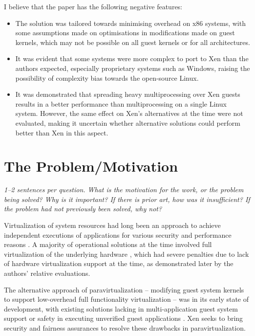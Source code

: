 \documentclass[11pt]{article}
\begin{document}
I believe that the paper has the following negative features:
\begin{itemize}
	\item The solution was tailored towards minimising overhead on x86 systems, with some assumptions made on optimisations in modifications made on guest kernels, which may not be possible on all guest kernels or for all architectures.
	\item It was evident that some systems were more complex to port to Xen than the authors expected, especially proprietary systems such as Windows, raising the possibility of complexity bias towards the open-source Linux.
	\item It was demonstrated that spreading heavy multiprocessing over Xen guests results in a better performance than multiprocessing on a single Linux system. However, the same effect on Xen's alternatives at the time were not evaluated, making it uncertain whether alternative solutions could perform better than Xen in this aspect.
\end{itemize}

\section*{The Problem/Motivation}
\textsl{1--2 sentences per question. What is the motivation for the work, or the problem being solved? Why is it important? If there is prior art, how was it insufficient? If the problem had not previously been solved, why not?}

Virtualization of system resources had long been an approach to achieve independent executions of applications for various security and performance reasons \cite{xing2012virtualization}. A majority of operational solutions at the time involved full virtualization of the underlying hardware \cite{goud2010method} \cite{devine2002virtualization}, which had severe penalties due to lack of hardware virtualization support at the time, as demonstrated later by the authors' relative evaluations. 

The alternative approach of paravirtualization -- modifying guest system kernels to support low-overhead full functionality virtualization -- was in its early state of development, with existing solutions lacking in multi-application guest system support \cite{whitaker2002scale} or safety in executing unverified guest applications \cite{peterson2003blueprint}. Xen seeks to bring security and fairness assurances to resolve these drawbacks in paravirtualization.
\end{document}
